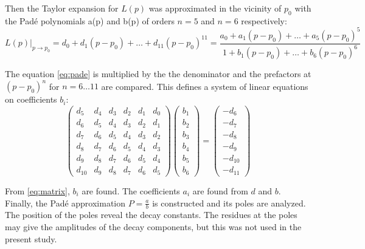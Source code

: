 Then the Taylor expansion for $L(p)$ was approximated in the vicinity of $p_0$ with the Pad{\'e} polynomials a(p) and b(p) of orders $n=5$ and $n=6$ respectively:\\

\begin{equation}
\label{eq:pade}
L(p)\vert_{p \rightarrow p_0} = d_0+d_1(p-p_0)+\dots+d_{11}(p-p_0)^{11}=\frac{a_0 + a_1(p-p_0) + \dots + a_5(p-p_0)^5}  {1 + b_1(p-p_0)+ \dots+ b_6(p-p_0)^6}
\end{equation}

The equation \ref{eq:pade} is multiplied by the the denominator and the prefactors at $(p-p_0)^{n}$ for $n=6\dots11$ are compared. This defines a system of linear equations on coefficients $b_i$:\\


\begin{equation}\label{eq:matrix}
  \begin{pmatrix}
    d_{5} & d_{4} & d_{3} & d_2 & d_1 & d_0\\
    d_6 & d_5 & d_4 & d_3 & d_2 & d_1\\
    d_7 & d_6 & d_5 & d_4 & d_3 & d_2\\
    d_8 & d_7 & d_6 & d_5 & d_4 & d_3\\
    d_9 & d_8 & d_7 & d_6 & d_5 & d_4\\
    d_{10} & d_9 & d_8 & d_7 & d_6 & d_5
  \end{pmatrix}
       \begin{pmatrix}
   b_1\\
   b_2\\
   b_3\\
   b_4\\
   b_5\\
   b_6
   \end{pmatrix}
  =
    \begin{pmatrix}
   -d_6\\
   -d_7\\
   -d_8\\
   -d_9\\
   -d_{10}\\
   -d_{11}
   \end{pmatrix}
\end{equation}

From \ref{eq:matrix}, $b_i$ are found. The coefficients $a_i$ are found from ${d}$ and ${b}$.\\

Finally, the Pad{\'e} approximation $P=\frac{a}{b}$ is constructed and its poles are analyzed. The position of the poles reveal the decay constants. The residues at the poles may give the amplitudes of the decay components, but this was not used in the present study.

